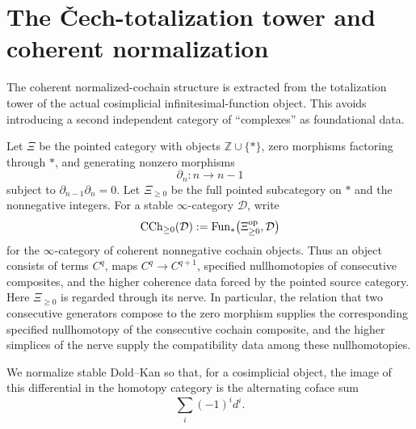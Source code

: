 \section{The \v{C}ech-totalization tower and coherent normalization}
\label{sec:stable-normalization-brave-new-forms}
\label{sec:modal-hodge-filtration}

The coherent normalized-cochain structure is extracted from the totalization tower of the actual
cosimplicial infinitesimal-function object.  This avoids introducing a second independent category
of ``complexes'' as foundational data.

\begin{convention}
\label{conv:monadic-de-rham-coherent-cochains}
Let \(\Xi\) be the pointed category with objects \(\mathbb Z\cup\{*\}\), zero morphisms factoring
through \(*\), and generating nonzero morphisms
\[
    \partial_n:n\longrightarrow n-1
\]
subject to \(\partial_{n-1}\partial_n=0\).  Let \(\Xi_{\geq0}\) be the full pointed subcategory on
\(*\) and the nonnegative integers.  For a stable \(\infty\)-category \(\mathcal D\), write
\[
    \operatorname{CCh}_{\geq0}(\mathcal D)
    :=
    \operatorname{Fun}_*\bigl(\Xi_{\geq0}^{\mathrm{op}},\mathcal D\bigr)
\]
for the \(\infty\)-category of coherent nonnegative cochain objects.  Thus an object consists of
terms \(C^q\), maps \(C^q\to C^{q+1}\), specified nullhomotopies of consecutive composites, and
the higher coherence data forced by the pointed source category.  Here \(\Xi_{\geq0}\) is regarded
through its nerve.  In particular, the relation that two consecutive generators compose to the zero
morphism supplies the corresponding specified nullhomotopy of the consecutive cochain composite, and
the higher simplices of the nerve supply the compatibility data among these nullhomotopies.

We normalize stable Dold--Kan so that, for a cosimplicial object, the image of
this differential in the homotopy category is the alternating coface sum
\[
    \sum_i(-1)^id^i.
\]
\end{convention}

